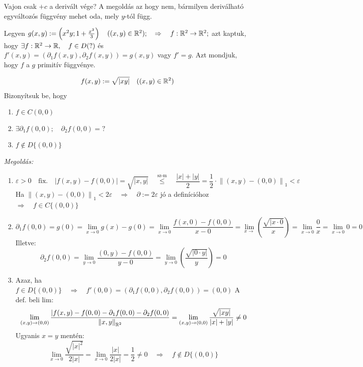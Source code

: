 \documentclass[a4paper,11.5pt]{article}
\newcommand{\norm}[1]{\left\lVert#1\right\rVert}
\begin{document}
	\begin{note}
		Vajon csak $+c$ a derivált vége? A megoldás az hogy nem, bármilyen deriválható egyváltozós függvény mehet oda, mely $y$-tól függ.
	\end{note}
	\begin{note}
		Legyen $g(x,y):=\left(x^2y;1+\frac{x^3}{3}\right)\quad ((x,y)\in\mathbb{R}^2);\quad \Rightarrow\quad f:\mathbb{R}^2\to\mathbb{R}^2;$ azt kaptuk, hogy $\exists f:\mathbb{R}^2\to\mathbb{R},\quad f\in D (?)$ és $f'(x,y)=(\partial_1f(x,y),\partial_2f(x,y))=g(x,y)$ vagy $f'=g$. Azt mondjuk, hogy $f$ a $g$ primitív függvénye.
	\end{note}
	\begin{task}
		\[ f(x,y):=\sqrt{|xy|}\quad ((x,y)\in\mathbb{R}^2) \]
		Bizonyítsuk be, hogy \begin{enumerate}
			\item $f\in C(0,0)$
			\item $\exists\partial_1f(0,0);\quad \partial_2f(0,0)=?$
			\item $f\notin D\{(0,0)\}$
		\end{enumerate}
		\textit{Megoldás:}
		\begin{enumerate}
			\item 
			\[ \varepsilon>0\quad \text{fix.}\quad |f(x,y)-f(0,0)|=\sqrt{|x,y|}\quad \overset{\text{sz-m}}{\leq}\quad \frac{|x|+|y|}{2}=\frac{1}{2}\cdot\norm{(x,y)-(0,0)}_1<\varepsilon \]
			Ha $\norm{(x,y)-(0,0)}_1<2\varepsilon\quad \Rightarrow\quad \partial:=2\varepsilon$ jó a definícióhoz\quad $\Rightarrow\quad f\in C\{(0,0)\}$
			\item \[\partial_1f(0,0)=g(0)=\lim_{x\to0}g(x)-g(0)=\lim_{x\to0}\frac{f(x,0)-f(0,0)}{x-0}=\lim_{x\to}\left(\frac{\sqrt{|x\cdot0}}{x}\right)=\lim_{x\to0}\frac{0}{x}=\lim_{x\to0}0=0 \]
			Illetve:
			\[ \partial_2f(0,0)=\lim_{y\to0}\frac{(0,y)-f(0,0)}{y-0}=\lim_{y\to0}\left(\frac{\sqrt{|0\cdot y|}}{y}\right)=0 \]
			\item
			Azaz, ha $f\in D\{(0,0)\}\quad \Rightarrow\quad f'(0,0)=(\partial_1f(0,0), \partial_2f(0,0))=(0,0)$
			A def. beli lim:
			\[ \lim_{(x,y)\to(0,0)}\frac{|f(x,y)-f(0,0)-\partial_1f(0,0)-\partial_2f(0,0)}{\norm{x,y}_{\R^2}}=\lim_{(x,y)\to(0,0)}\frac{\sqrt{|xy|}}{|x|+|y|}\not=0 \]
			Ugyanis $x=y$ mentén:
			\[ \lim_{x\to0}\frac{\sqrt{|x|^2}}{2|x|}=\lim_{x\to0}\frac{|x|}{2|x|}=\frac{1}{2}\not=0\quad \Rightarrow\quad f\notin D\{(0,0)\} \]
		\end{enumerate}
	\end{task}
\end{document}
